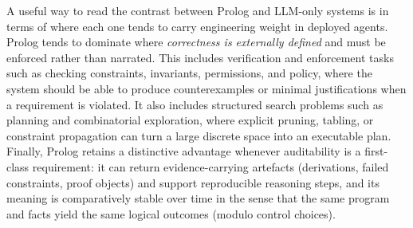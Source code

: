 %

\noindent A useful way to read the contrast between Prolog and LLM-only systems is in terms of where each one tends to carry engineering weight in deployed agents. Prolog tends to dominate where \emph{correctness is externally defined} and must be enforced rather than narrated. This includes verification and enforcement tasks such as checking constraints, invariants, permissions, and policy, where the system should be able to produce counterexamples or minimal justifications when a requirement is violated. It also includes structured search problems such as planning and combinatorial exploration, where explicit pruning, tabling, or constraint propagation can turn a large discrete space into an executable plan. Finally, Prolog retains a distinctive advantage whenever auditability is a first-class requirement: it can return evidence-carrying artefacts (derivations, failed constraints, proof objects) and support reproducible reasoning steps, and its meaning is comparatively stable over time in the sense that the same program and facts yield the same logical outcomes (modulo control choices).

